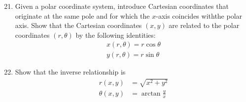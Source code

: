 \documentclass[12pt,a4paper]{report}
\begin{document}
\begin{enumerate}[label=\textbf{3.\arabic*}]
\setcounter{enumi}{20}
\item Given a polar coordinate system, introduce Cartesian coordinates that originate at the same pole and for which the $x$-axis coincides withthe polar axis.  Show that the Cartesian coordinates $(x,y)$ are related to the polar coordinates $(r,\theta)$ by the following identities:
\begin{align*}
	x(r,\theta) = r\cos \theta \\
	y(r,\theta) = r\sin \theta
\end{align*} 
\begin{center}

\end{center}


\item Show that the inverse relationship is
\begin{align*}
	r(x,y) &= \sqrt{x^2+y^2} \\
	\theta(x,y) &= \arctan \frac{y}{x}
\end{align*}


\end{enumerate}
\end{document}
